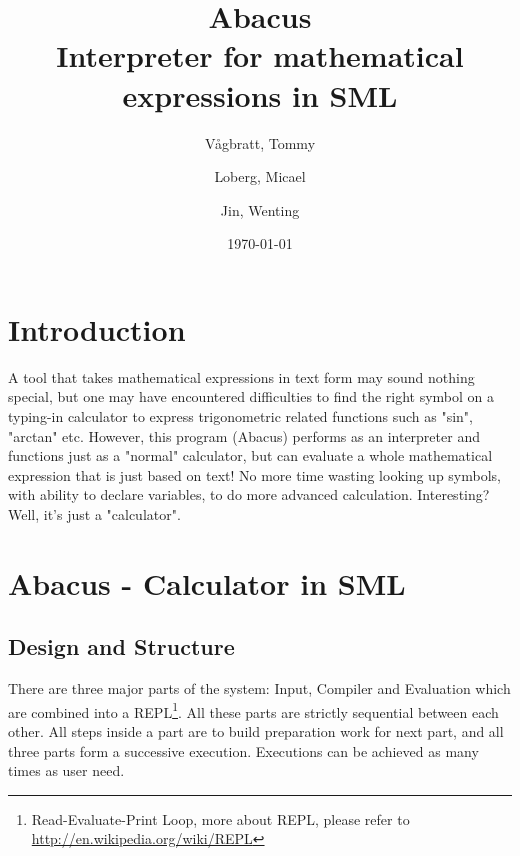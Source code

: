 \documentclass[12pt,a4paper]{article}
\title {Abacus \\ Interpreter for mathematical expressions in SML}
\author{
  Vågbratt, Tommy
  \and
  Loberg, Micael
	\and
  Jin, Wenting}
\date{\today}
\begin{document}
\maketitle
\tableofcontents
\newpage


\section{Introduction}
\textnormal{A tool that takes mathematical expressions in text form may sound nothing special, but one may have encountered difficulties to find the right symbol on a typing-in calculator to express trigonometric related functions such as "sin", "arctan" etc. However, this program (Abacus) performs as an interpreter and functions just as a "normal" calculator, but can evaluate a whole mathematical expression that is just based on text! No more time wasting looking up symbols, with ability to declare variables, to do more advanced calculation. Interesting? Well, it's just a "calculator".}

\section{Abacus - Calculator in SML}
\subsection{Design and Structure}
\textnormal{There are three major parts of the system: Input, Compiler and Evaluation which are combined into a REPL\footnote{Read-Evaluate-Print Loop, more about REPL, please refer to \url{http://en.wikipedia.org/wiki/REPL}}. All these parts are strictly sequential between each other. All steps inside a part are to build preparation work for next part, and all three parts form a successive execution. Executions can be achieved as many times as user need.}
\end{document}
